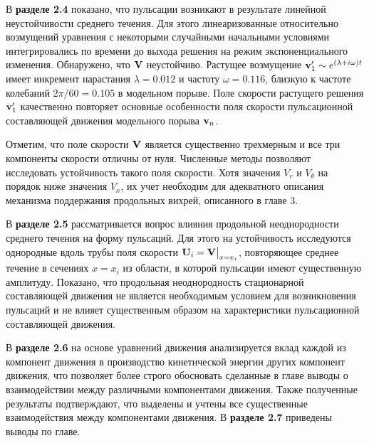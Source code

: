 В \textbf{разделе 2.4} показано, что пульсации возникают в результате линейной неустойчивости среднего течения. Для этого линеаризованные относительно возмущений уравнения с некоторыми случайными начальными условиями интегрировались по времени до выхода решения на режим экспоненциального изменения. Обнаружено, что $\mathbf{V}$ неустойчиво. Растущее возмущение $\mathbf{v}'_1 \sim e^{(\lambda+i\omega)t}$ имеет инкремент нарастания $\lambda=0.012$ и частоту $\omega=0.116$, близкую к частоте колебаний $2\pi/60=0.105$ в модельном порыве. Поле скорости растущего решения $\mathbf{v}'_1$ качественно повторяет основные особенности поля скорости пульсационной составляющей движения модельного порыва $\mathbf{v}_n$. 

Отметим, что поле скорости $\mathbf{V}$ является существенно трехмерным и все три компоненты скорости отличны от нуля. Численные методы позволяют исследовать устойчивость такого поля скорости. Хотя значения $V_r$ и $V_\theta$ на порядок ниже значения $V_x$, их учет необходим для адекватного описания механизма поддержания продольных вихрей, описанного в главе 3.

В \textbf{разделе 2.5} рассматривается вопрос влияния продольной неоднородности среднего течения на форму пульсаций. Для этого на устойчивость исследуются однородные вдоль трубы поля скорости $\mathbf{U}_i = \mathbf{V}\big|_{x=x_i}$, повторяющее среднее течение в сечениях $x = x_i$ из области, в которой пульсации имеют существенную амплитуду. Показано, что продольная неоднородность стационарной составляющей движения не является необходимым условием для возникновения пульсаций и не влияет существенным образом на характеристики пульсационной составляющей движения. 

В \textbf{разделе 2.6} на основе уравнений движения анализируется вклад каждой из компонент движения в производство кинетической энергии других компонент движения, что позволяет более строго обосновать сделанные в главе выводы о взаимодействии между различными компонентами движения. Также полученные результаты подтверждают, что выделены и учтены все существенные взаимодействия между компонентами движения. 
В \textbf{разделе 2.7} приведены выводы по главе. 


%
